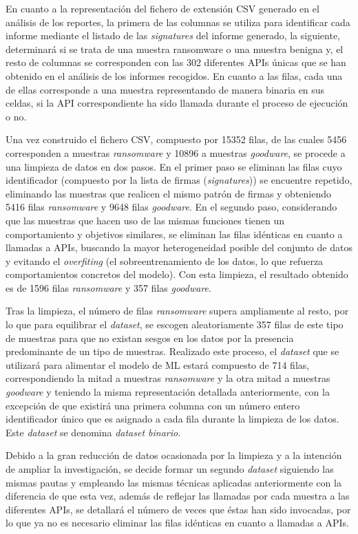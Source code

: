 En cuanto a la representación del fichero de extensión \gls{CSV} generado en el análisis de los reportes, la primera de las columnas se utiliza para identificar cada informe mediante el listado de las \textit{signatures} del informe generado, la siguiente, determinará si se trata de una muestra ransomware o una muestra benigna y, el resto de columnas se corresponden con las 302 diferentes \gls{API}s únicas que se han obtenido en el análisis de los informes recogidos. En cuanto a las filas, cada una de ellas corresponde a una muestra representando de manera binaria en sus celdas, si la \gls{API} correspondiente ha sido llamada durante el proceso de ejecución o no.

Una vez construido el fichero \gls{CSV}, compuesto por 15352 filas, de las cuales 5456 corresponden a muestras \textit{ransomware} y 10896 a muestras \textit{goodware}, se procede a una limpieza de datos en dos pasos. En el primer paso se eliminan las filas cuyo identificador (compuesto por la lista de firmas (\textit{signatures})) se encuentre repetido, eliminando las muestras que realicen el mismo patrón de firmas y obteniendo 5416 filas \textit{ransomware} y 9648 filas \textit{goodware}. En el segundo paso, considerando que las muestras que hacen uso de las mismas funciones tienen un comportamiento y objetivos similares, se eliminan las filas idénticas en cuanto a llamadas a \gls{API}s, buscando la mayor heterogeneidad posible del conjunto de datos y evitando el \textit{overfiting} (el sobreentrenamiento de los datos, lo que refuerza comportamientos concretos del modelo). Con esta limpieza, el resultado obtenido es de 1596 filas \textit{ransomware} y 357 filas \textit{goodware}.

Tras la limpieza, el número de filas \textit{ransomware} supera ampliamente al resto, por lo que para equilibrar el \textit{dataset}, se escogen aleatoriamente 357 filas de este tipo de muestras para que no existan sesgos en los datos por la presencia predominante de un tipo de muestras. Realizado este proceso, el \textit{dataset} que se utilizará para alimentar el modelo de \gls{ML} estará compuesto de 714 filas, correspondiendo la mitad a muestras \textit{ransomware} y la otra mitad a muestras \textit{goodware} y teniendo la misma representación detallada anteriormente, con la excepción de que existirá una primera columna con un número entero identificador único que es asignado a cada fila durante la limpieza de los datos. Este \textit{dataset} se denomina \textit{dataset binario}.

Debido a la gran reducción de datos ocasionada por la limpieza y a la intención de ampliar la investigación, se decide formar un segundo \textit{dataset} siguiendo las mismas pautas y empleando las mismas técnicas aplicadas anteriormente con la diferencia de que esta vez, además de reflejar las llamadas por cada muestra a las diferentes \gls{API}s, se detallará el número de veces que éstas han sido invocadas, por lo que ya no es necesario eliminar las filas idénticas en cuanto a llamadas a \gls{API}s.

